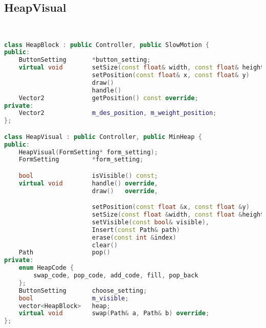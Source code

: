 \subsection{HeapVisual}
\begin{lstlisting}[language=C++]


class HeapBlock : public Controller, public SlowMotion {
public:
    ButtonSetting       *button_setting;
    virtual void        setSize(const float& width, const float& height) override,
                        setPosition(const float& x, const float& y)      override,
                        draw()                                           override,
                        handle()                                         override,
    Vector2             getPosition() const override;
private:
    Vector2             m_des_position, m_weight_position;
};

class HeapVisual : public Controller, public MinHeap {
public:
    HeapVisual(FormSetting* form_setting);
    FormSetting         *form_setting;

    bool                isVisible() const;
    virtual void        handle() override,
                        draw()   override,

                        setPosition(const float &x, const float &y)         override,
                        setSize(const float &width, const float &height)    override,
                        setVisible(const bool& visible),
                        Insert(const Path& path)                            override,
                        erase(const int &index)                             override,
                        clear()                                             override;
    Path                pop()                                               override;
private:
    enum HeapCode {
        swap_code, pop_code, add_code, fill, pop_back
    };
    ButtonSetting       choose_setting;
    bool                m_visible;
    vector<HeapBlock>   heap;
    virtual void        swap(Path& a, Path& b) override;
};






\end{lstlisting}
